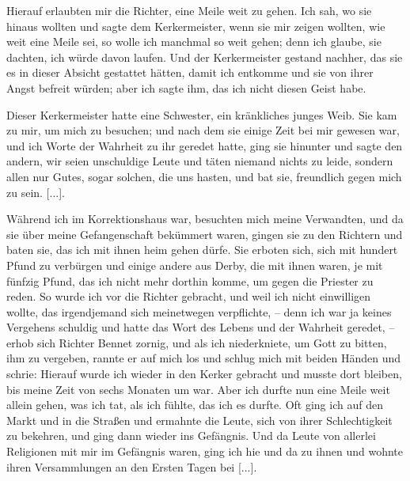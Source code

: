Hierauf erlaubten mir die Richter, eine Meile weit zu gehen.
Ich sah, wo sie hinaus wollten und sagte dem Kerkermeister,
wenn sie mir zeigen wollten, wie weit eine Meile sei, so wolle
ich manchmal so weit gehen; denn ich glaube, sie dachten, ich
würde davon laufen. Und der Kerkermeister gestand nachher,
das sie es in dieser Absicht gestattet hätten, damit ich entkomme
und sie von ihrer Angst befreit würden; aber ich sagte ihm, das
ich nicht diesen Geist habe. 

Dieser Kerkermeister hatte eine Schwester, ein kränkliches
junges Weib. Sie kam zu mir, um mich zu besuchen; und nach
dem sie einige Zeit bei mir gewesen war, und ich Worte der
Wahrheit zu ihr geredet hatte, ging sie hinunter und sagte den
andern, wir seien unschuldige Leute und täten niemand nichts zu
leide, sondern allen nur Gutes, sogar solchen, die uns hasten,
und bat sie, freundlich gegen mich zu sein. [...].

Während ich im Korrektionshaus war, besuchten mich meine
Verwandten, und da sie über meine Gefangenschaft bekümmert
waren, gingen sie zu den Richtern und baten sie, das ich mit
ihnen heim gehen dürfe. Sie erboten sich, sich mit hundert Pfund
zu verbürgen und einige andere aus Derby, die mit ihnen waren,
je mit fünfzig Pfund, das ich nicht mehr dorthin komme, um
gegen die Priester zu reden. So wurde ich vor die Richter
gebracht, und weil ich nicht einwilligen wollte, das irgendjemand
sich meinetwegen verpflichte, -- denn ich war ja keines Vergehens
schuldig und hatte das Wort des Lebens und der Wahrheit geredet, --  
erhob sich Richter Bennet zornig, und als ich niederkniete, um
Gott zu bitten, ihm zu vergeben, rannte er auf mich los und schlug
mich mit beiden Händen und schrie:  Hierauf wurde ich wieder in den Kerker gebracht
und musste dort bleiben, bis meine Zeit von sechs Monaten um
war. Aber ich durfte nun eine Meile weit allein gehen, was ich
tat, als ich fühlte, das ich es durfte. Oft ging ich auf den Markt
und in die Straßen und ermahnte die Leute, sich von ihrer
Schlechtigkeit zu bekehren, und ging dann wieder ins Gefängnis.
Und da Leute von allerlei Religionen mit mir im Gefängnis
waren, ging ich hie und da zu ihnen und wohnte ihren 
Versammlungen an den Ersten Tagen bei [...].